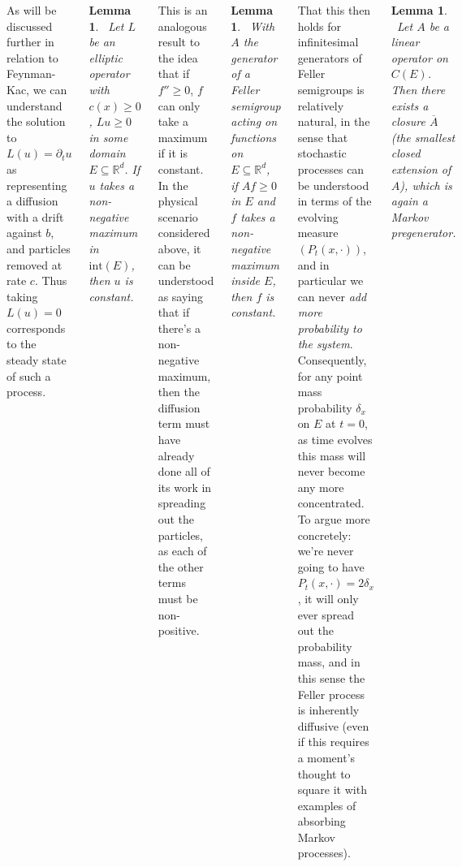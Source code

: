 \documentclass{tikzposter} %
\newtheorem{lemma}[theorem]{Lemma}
\begin{document}
\begin{columns}
{{      As will be discussed further in relation to Feynman-Kac, we can understand the solution to $L(u) = \partial_t u$ as representing a diffusion with a drift against $b$, and particles removed at rate $c$. Thus taking $L(u) = 0$ corresponds to the steady state of such a process. \\

      \begin{lemma}
    \ Let $L$ be an elliptic operator with $c(x) \ge 0$, $Lu \ge 0$ in some domain $E \subseteq \mathbb{R}^d$. If $u$ takes a non-negative maximum in $\mathrm{int}(E)$, then $u$ is constant.
      \end{lemma}
      \hphantom{}

      This is an analogous result to the idea that if $f'' \ge 0$, $f$ can only take a maximum if it is constant. In the physical scenario considered above, it can be understood as saying that if there's a non-negative maximum, then the diffusion term must have already done all of its work in spreading out the particles, as each of the other terms must be non-positive.  \\

      \begin{lemma}
    \ With $A$ the generator of a Feller semigroup acting on functions on $E \subseteq \mathbb{R}^d$, if $Af \ge 0$ in $E$ and $f$ takes a non-negative maximum inside $E$, then $f$ is constant.
      \end{lemma}
      \hphantom{}

      That this then holds for infinitesimal generators of Feller semigroups is relatively natural, in the sense that stochastic processes can be understood in terms of the evolving measure $(P_t(x, \cdot))$, and in particular we can never \emph{add more probability to the system}. Consequently, for any point mass probability $\delta_x$ on $E$ at $t = 0$, as time evolves this mass will never become any more concentrated. To argue more concretely: we're never going to have $P_t(x, \cdot) = 2\delta_x$, it will only ever spread out the probability mass, and in this sense the Feller process is inherently diffusive (even if this requires a moment's thought to square it with examples of absorbing Markov processes). \\

      \begin{lemma}
    \ Let $A$ be a linear operator on $C(E)$. Then there exists a closure $\overline{A}$ (the smallest closed extension of $A$), which is again a Markov pregenerator.
      \end{lemma}
      \hphantom{}

}}
\end{columns}
\end{document}
